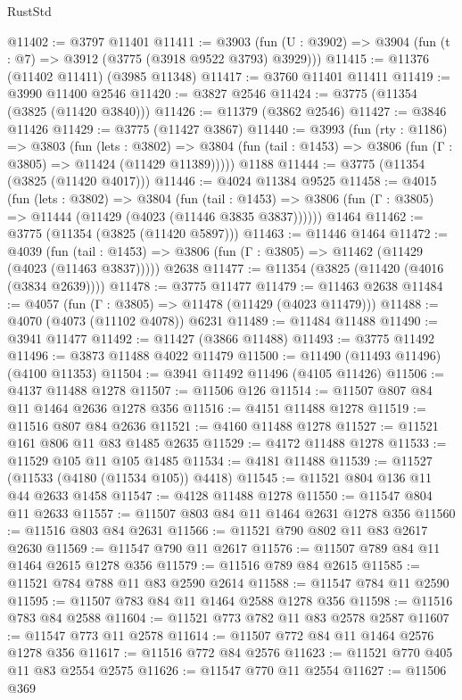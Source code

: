 \begin{lexlean}{RustStd}
\begin{coremodule}
{\begin{coremodule}
{{{{{{{{{{{{{{{{{{{{{{{{{{{{{{{@11402 := @3797 @11401
@11411 := @3903 (fun (U : @3902) => @3904 (fun (t : @7) => @3912 (@3775 (@3918 @9522 @3793) @3929)))
@11415 := @11376 (@11402 @11411) (@3985 @11348)
@11417 := @3760 @11401 @11411
@11419 := @3990 @11400 @2546
@11420 := @3827 @2546
@11424 := @3775 (@11354 (@3825 (@11420 @3840)))
@11426 := @11379 (@3862 @2546)
@11427 := @3846 @11426
@11429 := @3775 (@11427 @3867)
@11440 := @3993
    (fun (rty : @1186) =>
    @3803
      (fun (lets : @3802) =>
      @3804 (fun (tail : @1453) => @3806 (fun (Γ : @3805) => @11424 (@11429 @11389)))))
    @1188
@11444 := @3775 (@11354 (@3825 (@11420 @4017)))
@11446 := @4024 @11384 @9525
@11458 := @4015
    (fun (lets : @3802) =>
    @3804
      (fun (tail : @1453) =>
      @3806 (fun (Γ : @3805) => @11444 (@11429 (@4023 (@11446 @3835 @3837))))))
    @1464
@11462 := @3775 (@11354 (@3825 (@11420 @5897)))
@11463 := @11446 @1464
@11472 := @4039
    (fun (tail : @1453) => @3806 (fun (Γ : @3805) => @11462 (@11429 (@4023 (@11463 @3837)))))
    @2638
@11477 := @11354 (@3825 (@11420 (@4016 (@3834 @2639))))
@11478 := @3775 @11477
@11479 := @11463 @2638
@11484 := @4057 (fun (Γ : @3805) => @11478 (@11429 (@4023 @11479)))
@11488 := @4070 (@4073 (@11102 @4078)) @6231
@11489 := @11484 @11488
@11490 := @3941 @11477
@11492 := @11427 (@3866 @11488)
@11493 := @3775 @11492
@11496 := @3873 @11488 @4022 @11479
@11500 := @11490 (@11493 @11496) (@4100 @11353)
@11504 := @3941 @11492 @11496 (@4105 @11426)
@11506 := @4137 @11488 @1278
@11507 := @11506 @126
@11514 := @11507 @807 @84 @11 @1464 @2636 @1278 @356
@11516 := @4151 @11488 @1278
@11519 := @11516 @807 @84 @2636
@11521 := @4160 @11488 @1278
@11527 := @11521 @161 @806 @11 @83 @1485 @2635
@11529 := @4172 @11488 @1278
@11533 := @11529 @105 @11 @105 @1485
@11534 := @4181 @11488
@11539 := @11527 (@11533 (@4180 (@11534 @105)) @4418)
@11545 := @11521 @804 @136 @11 @44 @2633 @1458
@11547 := @4128 @11488 @1278
@11550 := @11547 @804 @11 @2633
@11557 := @11507 @803 @84 @11 @1464 @2631 @1278 @356
@11560 := @11516 @803 @84 @2631
@11566 := @11521 @790 @802 @11 @83 @2617 @2630
@11569 := @11547 @790 @11 @2617
@11576 := @11507 @789 @84 @11 @1464 @2615 @1278 @356
@11579 := @11516 @789 @84 @2615
@11585 := @11521 @784 @788 @11 @83 @2590 @2614
@11588 := @11547 @784 @11 @2590
@11595 := @11507 @783 @84 @11 @1464 @2588 @1278 @356
@11598 := @11516 @783 @84 @2588
@11604 := @11521 @773 @782 @11 @83 @2578 @2587
@11607 := @11547 @773 @11 @2578
@11614 := @11507 @772 @84 @11 @1464 @2576 @1278 @356
@11617 := @11516 @772 @84 @2576
@11623 := @11521 @770 @405 @11 @83 @2554 @2575
@11626 := @11547 @770 @11 @2554
@11627 := @11506 @369
}}}}}}}}}}}}}}}}}}}}}}}}}}}}}}}
\end{coremodule}}
\end{coremodule}
\end{lexlean}
